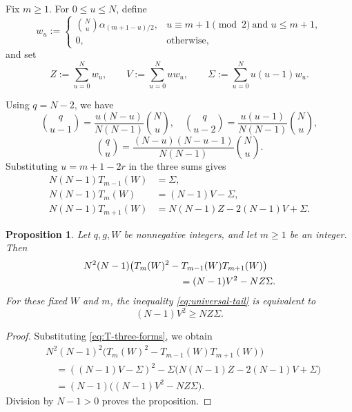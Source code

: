 \documentclass[12pt]{amsart}
\theoremstyle{plain}
\newtheorem{proposition}[theorem]{Proposition}
\theoremstyle{definition}
\theoremstyle{remark}
\begin{document}
Fix \(m\ge1\).  For \(0\le u\le N\), define
\begin{equation}\label{eq:w-definition}
 w_u:=
 \begin{cases}
  \displaystyle\binom Nu\alpha_{(m+1-u)/2},
   &u\equiv m+1\pmod2\ \text{and }u\le m+1,\\[5pt]
  0,&\text{otherwise},
 \end{cases}
\end{equation}
and set
\begin{equation}\label{eq:moment-sums}
 Z:=\sum_{u=0}^{N}w_u,\qquad
 V:=\sum_{u=0}^{N}u w_u,\qquad
 \Sigma:=\sum_{u=0}^{N}u(u-1)w_u.
\end{equation}

Using \(q=N-2\), we have
\[
 \binom q{u-1}
 =\frac{u(N-u)}{N(N-1)}\binom Nu,\quad
 \binom q{u-2}
 =\frac{u(u-1)}{N(N-1)}\binom Nu,
\]
\[
 \binom qu
 =\frac{(N-u)(N-u-1)}{N(N-1)}\binom Nu.
\]
Substituting \(u=m+1-2r\) in the three sums gives
\begin{equation}\label{eq:T-three-forms}
\begin{aligned}
 N(N-1)T_{m-1}(W)
 &=\Sigma,\\
 N(N-1)T_m(W)
 &=(N-1)V-\Sigma,\\
 N(N-1)T_{m+1}(W)
 &=N(N-1)Z-2(N-1)V+\Sigma.
\end{aligned}
\end{equation}

\begin{proposition}\label{prop:master-identity}
Let \(q,g,W\) be nonnegative integers, and let \(m\ge1\) be an integer.
Then
\begin{equation}\label{eq:master-identity}
\begin{aligned}
 &N^2(N-1)
 \bigl(T_m(W)^2-T_{m-1}(W)T_{m+1}(W)\bigr)\\
 &\hspace{35mm}=(N-1)V^2-NZ\Sigma.
\end{aligned}
\end{equation}
For these fixed \(W\) and \(m\), the inequality
\eqref{eq:universal-tail} is equivalent to
\begin{equation}\label{eq:moment-goal}
 (N-1)V^2\ge NZ\Sigma.
\end{equation}
\end{proposition}

\begin{proof}
Substituting \eqref{eq:T-three-forms}, we obtain
\begin{align*}
 &N^2(N-1)^2
 \bigl(T_m(W)^2-T_{m-1}(W)T_{m+1}(W)\bigr)\\
 &\quad=((N-1)V-\Sigma)^2
 -\Sigma\bigl(N(N-1)Z-2(N-1)V+\Sigma\bigr)\\
 &\quad=(N-1)\bigl((N-1)V^2-NZ\Sigma\bigr).
\end{align*}
Division by \(N-1>0\) proves the proposition.
\end{proof}
\end{document}
